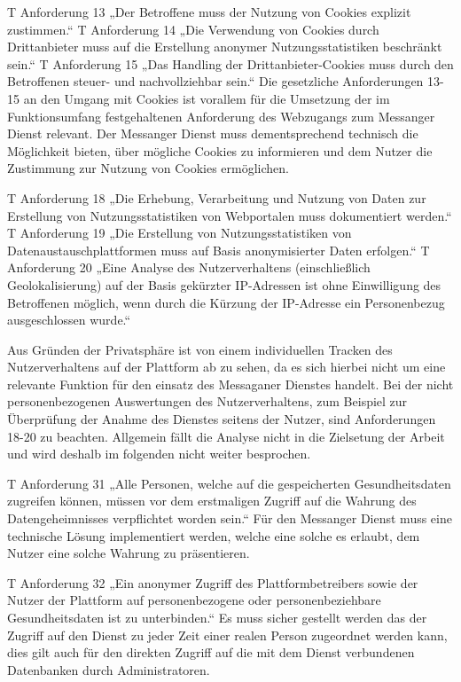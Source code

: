 T Anforderung 13
„Der Betroffene muss der Nutzung von Cookies explizit zustimmen.“
T Anforderung 14
„Die Verwendung von Cookies durch Drittanbieter muss auf die Erstellung anonymer Nutzungsstatistiken beschränkt sein.“
T Anforderung 15
„Das Handling der Drittanbieter-Cookies muss durch den Betroffenen steuer- und nachvollziehbar sein.“
Die gesetzliche Anforderungen 13-15 an den Umgang mit Cookies ist vorallem für die Umsetzung der im Funktionsumfang festgehaltenen Anforderung des Webzugangs zum Messanger Dienst relevant. Der Messanger Dienst muss dementsprechend technisch die Möglichkeit bieten, über mögliche Cookies zu informieren und dem Nutzer die Zustimmung zur Nutzung von Cookies ermöglichen.

T Anforderung 18
„Die Erhebung, Verarbeitung und Nutzung von Daten zur Erstellung von Nutzungsstatistiken von Webportalen muss dokumentiert werden.“
T Anforderung 19
„Die Erstellung von Nutzungsstatistiken von Datenaustauschplattformen muss auf Basis anonymisierter Daten erfolgen.“
T Anforderung 20
„Eine Analyse des Nutzerverhaltens (einschließlich Geolokalisierung) auf der Basis gekürzter IP-Adressen ist ohne Einwilligung des Betroffenen möglich, wenn durch die Kürzung der IP-Adresse ein Personenbezug ausgeschlossen wurde.“

Aus Gründen der Privatsphäre ist von einem individuellen Tracken des Nutzerverhaltens auf der Plattform ab zu sehen, da es sich hierbei nicht um eine relevante Funktion für den einsatz des Messaganer Dienstes handelt. Bei der nicht personenbezogenen Auswertungen des Nutzerverhaltens, zum Beispiel zur Überprüfung der Anahme des Dienstes seitens der Nutzer, sind Anforderungen 18-20 zu beachten. Allgemein fällt die Analyse nicht in die Zielsetung der Arbeit und wird deshalb im folgenden nicht weiter besprochen.

T Anforderung 31
„Alle Personen, welche auf die gespeicherten Gesundheitsdaten zugreifen können, müssen vor dem erstmaligen Zugriff auf die Wahrung des Datengeheimnisses verpflichtet worden sein.“
Für den Messanger Dienst muss eine technische Lösung implementiert werden, welche eine solche es erlaubt, dem Nutzer eine solche Wahrung zu präsentieren.

T Anforderung 32
„Ein anonymer Zugriff des Plattformbetreibers sowie der Nutzer der Plattform auf personenbezogene oder personenbeziehbare Gesundheitsdaten ist zu unterbinden.“
Es muss sicher gestellt werden das der Zugriff auf den Dienst zu jeder Zeit einer realen Person zugeordnet werden kann, dies gilt auch für den direkten Zugriff auf die mit dem Dienst verbundenen Datenbanken durch Administratoren.

